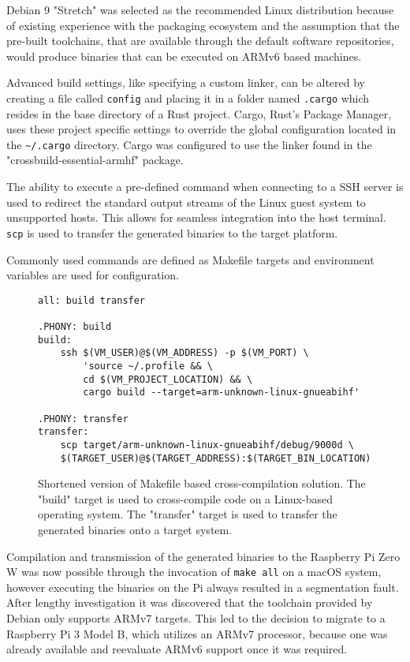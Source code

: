 Debian 9 "Stretch" was selected as the recommended Linux distribution because of existing experience with the packaging ecosystem and the assumption that the pre-built toolchains, that are available through the default software repositories, would produce binaries that can be executed on ARMv6 based machines. 

Advanced build settings, like specifying a custom linker, can be altered by creating a file called \texttt{config} and placing it in a folder named \texttt{.cargo} which resides in the base directory of a Rust project. 
Cargo, Rust’s Package Manager, uses these project specific settings to override the global configuration located in the \texttt{\~{}/.cargo} directory. 
Cargo was configured to use the linker found in the "crossbuild-essential-armhf" package. 

The ability to execute a pre-defined command when connecting to a SSH server is used to redirect the standard output streams of the Linux guest system to unsupported hosts. This allows for seamless integration into the host terminal. \texttt{scp} is used to transfer the generated binaries to the target platform.

Commonly used commands are defined as Makefile targets and environment variables are used for configuration.

\begin{figure}[H]
\begin{verbatim}
all: build transfer

.PHONY: build
build:
	ssh $(VM_USER)@$(VM_ADDRESS) -p $(VM_PORT) \
		'source ~/.profile && \
		cd $(VM_PROJECT_LOCATION) && \
		cargo build --target=arm-unknown-linux-gnueabihf'

.PHONY: transfer
transfer:
	scp target/arm-unknown-linux-gnueabihf/debug/9000d \
	$(TARGET_USER)@$(TARGET_ADDRESS):$(TARGET_BIN_LOCATION)
\end{verbatim}
\caption{Shortened version of Makefile based cross-compilation solution. The "build" target is used to cross-compile code on a Linux-based operating system. The "transfer" target is used to transfer the generated binaries onto a target system.}
\end{figure}

Compilation and transmission of the generated binaries to the Raspberry Pi Zero W was now possible through the invocation of \texttt{make all} on a macOS system, however executing the binaries on the Pi always resulted in a segmentation fault. After lengthy investigation it was discovered that the toolchain provided by Debian only supports ARMv7 targets. This led to the decision to migrate to a Raspberry Pi 3 Model B, which utilizes an ARMv7 processor, because one was already available and reevaluate ARMv6 support once it was required.

